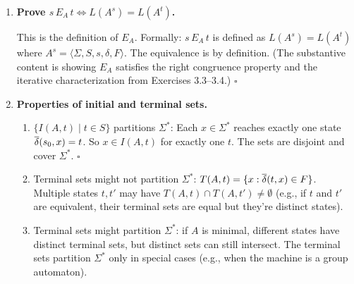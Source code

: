 \begin{enumerate}[{3.}1.]
\item \textbf{Prove $s\,E_A\,t\Leftrightarrow L(A^s)=L(A^t)$.}

This is the definition of $E_A$. Formally: $s\,E_A\,t$ is defined as $L(A^s)=L(A^t)$ where $A^s=\langle\Sigma,S,s,\delta,F\rangle$. The equivalence is by definition. (The substantive content is showing $E_A$ satisfies the right congruence property and the iterative characterization from Exercises 3.3--3.4.) $\square$

\item \textbf{Properties of initial and terminal sets.}

\begin{enumerate}
\item $\{I(A,t)\mid t\in S\}$ partitions $\Sigma^*$: Each $x\in\Sigma^*$ reaches exactly one state $\overline{\delta}(s_0,x)=t$. So $x\in I(A,t)$ for exactly one $t$. The sets are disjoint and cover $\Sigma^*$. $\square$

\item Terminal sets might not partition $\Sigma^*$: $T(A,t)=\{x:\overline{\delta}(t,x)\in F\}$. Multiple states $t,t'$ may have $T(A,t)\cap T(A,t')\neq\emptyset$ (e.g., if $t$ and $t'$ are equivalent, their terminal sets are equal but they're distinct states).

\item Terminal sets might partition $\Sigma^*$: if $A$ is minimal, different states have distinct terminal sets, but distinct sets can still intersect. The terminal sets partition $\Sigma^*$ only in special cases (e.g., when the machine is a group automaton).
\end{enumerate}

\end{enumerate}

